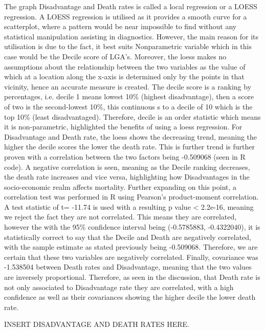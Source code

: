 \documentclass[12pt,a4paper]{article}
\begin{document}
	The graph Disadvantage and Death rates is called a local regression or a LOESS regression. A LOESS regression is utilised as it provides a smooth curve for a scatterplot, where a pattern would be near impossible to find without any statistical manipulation assisting in diagnostics. However, the main reason for its utilisation is due to the fact, it best suits Nonparametric variable which in this case would be the Decile score of LGA’s.  Moreover, the loess makes no assumptions about the relationship between the two variables as the value of which at a location along the x-axis is determined only by the points in that vicinity, hence an accurate measure is created. The decile score is a ranking by percentages, i.e. decile 1 means lowest 10\% (highest disadvantage), then a score of two is the second-lowest 10\%, this continuous s to a decile of 10 which is the top 10\% (least disadvantaged).  Therefore, decile is an order statistic which means it is non-parametric, highlighted the benefits of using a loess regression. For Disadvantage and Death rate, the loess shows the decreasing trend, meaning the higher the decile scores the lower the death rate. This is further trend is further proven with a correlation between the two factors being -0.509068 (seen in R code). A negative correlation is seen, meaning as the Decile ranking decreases, the death rate increases and vice versa, highlighting how Disadvantages in the socio-economic realm affects mortality. Further expanding on this point, a correlation test was performed in R using Pearson’s product-moment correlation. A test statistic of t= -11.74 is used with a resulting p value < 2.2e-16, meaning we reject the fact they are not correlated. This means they are correlated, however the with the 95\% confidence interval being (-0.5785883, -0.4322040), it is statistically correct to say that the Decile and Death are negatively correlated, with the sample estimate as stated previously being -0.509068. Therefore, we are certain that these two variables are negatively correlated. Finally, covariance was   -1.538504 between Death rates and Disadvantage, meaning that the two values are inversely proportional. Therefore, as seen in the discussion, that Death rate is not only associated to Disadvantage rate they are correlated, with a high confidence as well as their covariances showing the higher decile the lower death rate.
	
	INSERT DISADVANTAGE AND DEATH RATES HERE.
	
\end{document}
